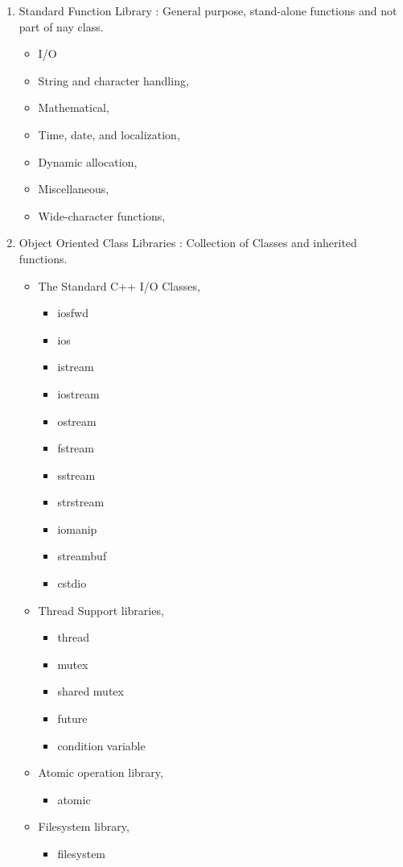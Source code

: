 \documentclass[12pt]{article}
\begin{document}
\begin{enumerate}
\item Standard Function Library : General purpose, stand-alone functions and not part of nay class.
	\begin{itemize}
	\item I/O
	\item String and character handling,
	\item Mathematical,
	\item Time, date, and localization,
	\item Dynamic allocation,
	\item Miscellaneous,
	\item Wide-character functions,
	\end{itemize}
\item Object Oriented Class Libraries : Collection of Classes and inherited functions.
	\begin{itemize}
	\item The Standard C++ I/O Classes,
		\begin{itemize}
		\item iosfwd
		\item ios
		\item istream
		\item iostream
		\item ostream
		\item fstream
		\item sstream
		\item strstream
		\item iomanip
		\item streambuf
		\item cstdio
		\end{itemize}
		
	\item Thread Support libraries,
		\begin{itemize}
		\item thread
		\item mutex
		\item shared mutex
		\item future
		\item condition variable
		\end{itemize}
		
	\item Atomic operation library,
		\begin{itemize}
		\item atomic
		\end{itemize}
	\item Filesystem library,
		\begin{itemize}
		\item filesystem
		\end{itemize}
		

\end{itemize}
\end{enumerate}
\end{document}
